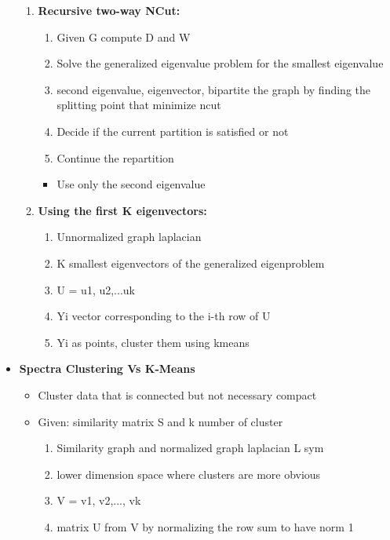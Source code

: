 \begin{itemize}
    \begin{enumerate}
        \item \textbf{Recursive two-way NCut:}
        \begin{enumerate}
            \item Given G compute D and W
            \item Solve the generalized eigenvalue problem for the smallest eigenvalue
            \item second eigenvalue, eigenvector, bipartite the graph by finding the splitting point that minimize ncut
            \item Decide if the current partition is satisfied or not
            \item Continue the repartition
        \end{enumerate}
        \begin{itemize}
            \item Use only the second eigenvalue 
        \end{itemize}
        \item \textbf{Using the first K eigenvectors:}
        \begin{enumerate}
            \item Unnormalized graph laplacian
            \item K smallest eigenvectors of the generalized eigenproblem
            \item U = u1, u2,...uk
            \item Yi vector corresponding to the i-th row of U
            \item Yi as points, cluster them using kmeans
        \end{enumerate}
    \end{enumerate}
    \item \textbf{Spectra Clustering Vs K-Means}
    \begin{itemize}
        \item Cluster data that is connected but not necessary compact
        \item Given: similarity matrix S and k number of cluster
        \begin{enumerate}
            \item Similarity graph and normalized graph laplacian L sym
            \item lower dimension space where clusters are more obvious
            \item V = v1, v2,..., vk
            \item matrix U from V by normalizing the row sum to have norm 1

\end{enumerate}
\end{itemize}
\end{itemize}
